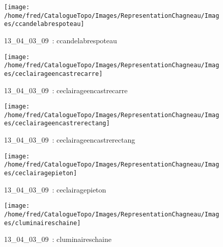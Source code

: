\documentclass[12pt,titlepage]{book}
\begin{document}
\begin{figure}[h!]
\begin{minipage}[t]{3cm}
\begin{center}
    \end{center}
  \end{minipage}
  \begin{minipage}[t]{3cm}
    \begin{center}
      \texttt{[image: /home/fred/CatalogueTopo/Images/RepresentationChagneau/Images/ccandelabrespoteau]}
      \caption[~13\_04\_03\_09]{\small{13\_04\_03\_09~:} \tiny{ccandelabrespoteau}}\label{ccandelabrespoteau}
    \end{center}
  \end{minipage}
  \begin{minipage}[t]{3cm}
    \begin{center}
      \texttt{[image: /home/fred/CatalogueTopo/Images/RepresentationChagneau/Images/ceclairageencastrecarre]}
      \caption[~13\_04\_03\_09]{\small{13\_04\_03\_09~:} \tiny{ceclairageencastrecarre}}\label{ceclairageencastrecarre}
    \end{center}
  \end{minipage}
  \begin{minipage}[t]{3cm}
    \begin{center}
      \texttt{[image: /home/fred/CatalogueTopo/Images/RepresentationChagneau/Images/ceclairageencastrerectang]}
      \caption[~13\_04\_03\_09]{\small{13\_04\_03\_09~:} \tiny{ceclairageencastrerectang}}\label{ceclairageencastrerectang}
    \end{center}
  \end{minipage}
  \begin{minipage}[t]{3cm}
    \begin{center}
      \texttt{[image: /home/fred/CatalogueTopo/Images/RepresentationChagneau/Images/ceclairagepieton]}
      \caption[~13\_04\_03\_09]{\small{13\_04\_03\_09~:} \tiny{ceclairagepieton}}\label{ceclairagepieton}
    \end{center}
  \end{minipage}
  \begin{minipage}[t]{3cm}
    \begin{center}
      \texttt{[image: /home/fred/CatalogueTopo/Images/RepresentationChagneau/Images/cluminaireschaine]}
      \caption[~13\_04\_03\_09]{\small{13\_04\_03\_09~:} \tiny{cluminaireschaine}}\label{cluminaireschaine}
    \end{center}

\end{minipage}
\end{figure}
\end{document}
